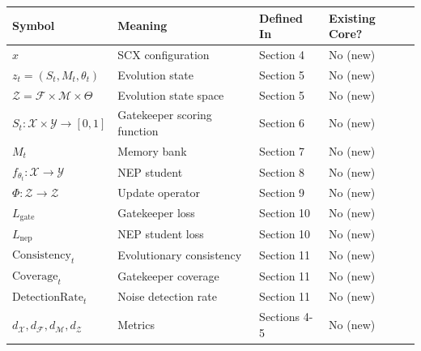 \documentclass[
  12pt,
]{article}
\begin{document}
\begin{longtable}[]{@{}
  >{\raggedright\arraybackslash}p{}
  >{\raggedright\arraybackslash}p{}
  >{\raggedright\arraybackslash}p{}
  >{\raggedright\arraybackslash}p{}@{}}
\toprule\noalign{}
\begin{minipage}[b]{\linewidth}\raggedright
Symbol
\end{minipage} & \begin{minipage}[b]{\linewidth}\raggedright
Meaning
\end{minipage} & \begin{minipage}[b]{\linewidth}\raggedright
Defined In
\end{minipage} & \begin{minipage}[b]{\linewidth}\raggedright
Existing Core?
\end{minipage} \\
\midrule\noalign{}
\endhead
\bottomrule\noalign{}
\endlastfoot
\(x\) & SCX configuration & Section 4 & No (new) \\
\(z_t = (S_t, M_t, \theta_t)\) & Evolution state & Section 5 & No
(new) \\
\(\mathcal{Z} = \mathcal{F} \times \mathcal{M} \times \Theta\) &
Evolution state space & Section 5 & No (new) \\
\(S_t: \mathcal{X} \times \mathcal{Y} \to [0,1]\) & Gatekeeper scoring
function & Section 6 & No (new) \\
\(M_t\) & Memory bank & Section 7 & No (new) \\
\(f_{\theta_t}: \mathcal{X} \to \mathcal{Y}\) & NEP student & Section 8
& No (new) \\
\(\Phi: \mathcal{Z} \to \mathcal{Z}\) & Update operator & Section 9 & No
(new) \\
\(L_{\text{gate}}\) & Gatekeeper loss & Section 10 & No (new) \\
\(L_{\text{nep}}\) & NEP student loss & Section 10 & No (new) \\
\(\text{Consistency}_t\) & Evolutionary consistency & Section 11 & No
(new) \\
\(\text{Coverage}_t\) & Gatekeeper coverage & Section 11 & No (new) \\
\(\text{DetectionRate}_t\) & Noise detection rate & Section 11 & No
(new) \\
\(d_{\mathcal{X}}, d_{\mathcal{F}}, d_{\mathcal{M}}, d_{\mathcal{Z}}\) &
Metrics & Sections 4-5 & No (new) \\

\end{longtable}
\end{document}
